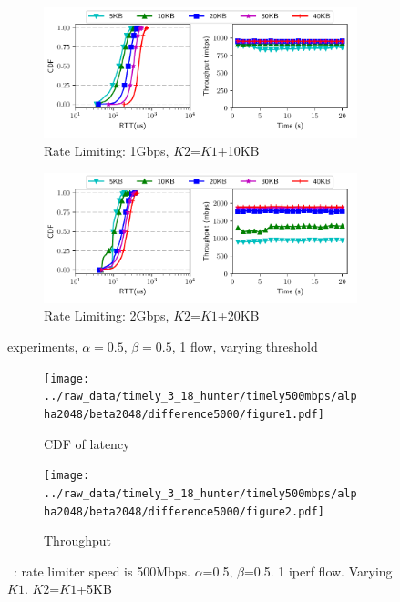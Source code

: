 \begin{figure}[!t]
\centering
\begin{subfigure}[b]{0.49\textwidth}
\centering
\includegraphics[width=\textwidth]{../raw_data/spring_benchmark/1gbps.pdf}
\caption{Rate Limiting: 1Gbps, $K2$=$K1$+10KB}
\label{fig:spring-1g} 
\end{subfigure}
\begin{subfigure}[b]{0.49\textwidth}
\centering
\includegraphics[width=\textwidth]{../raw_data/spring_benchmark/2gbps.pdf}
\caption{Rate Limiting: 2Gbps, $K2$=$K1$+20KB}
\label{fig:spring-2g} 
\end{subfigure}
\caption{\nametwo experiments, $\alpha=0.5$, $\beta=0.5$, 1 flow, varying threshold}
\label{fig:spring} 
\end{figure}

\iffalse
\begin{figure}
\centering
 \begin{subfigure}[b]{0.8\columnwidth}
 \centering
 \texttt{[image: ../raw\_data/timely\_3\_18\_hunter/timely500mbps/alpha2048/beta2048/difference5000/figure1.pdf]}
 \caption{CDF of latency}
 \end{subfigure}
 \begin{subfigure}[b]{0.8\columnwidth}
 \centering
 \texttt{[image: ../raw\_data/timely\_3\_18\_hunter/timely500mbps/alpha2048/beta2048/difference5000/figure2.pdf]}
 \caption{Throughput}
 \end{subfigure}
\caption{~\spring: rate limiter speed is 500Mbps. $\alpha$=0.5, $\beta$=0.5. 1 iperf flow. Varying $K1$. $K2$=$K1$+5KB}
\label{timely-1iperf-500mbps}
\end{figure}


